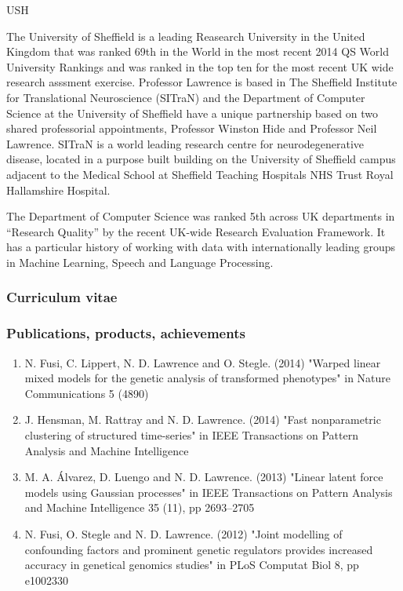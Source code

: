 \begin{sitedescription}{USH}


The University of Sheffield is a leading Reasearch University in the
United Kingdom that was ranked 69th in the World in the most recent
2014 QS World University Rankings and was ranked in the top ten for
the most recent UK wide research asssment exercise.  Professor
Lawrence is based in The Sheffield Institute for Translational
Neuroscience (SITraN) and the Department of Computer Science at the
University of Sheffield have a unique partnership based on two shared
professorial appointments, Professor Winston Hide and Professor Neil
Lawrence.  SITraN is a world leading research centre for
neurodegenerative disease, located in a purpose built building on the
University of Sheffield campus adjacent to the Medical School at
Sheffield Teaching Hospitals NHS Trust Royal Hallamshire Hospital. 

The Department of Computer Science was ranked 5th across UK
departments in ``Research Quality'' by the recent UK-wide Research
Evaluation Framework. It has a particular history of working with data
with internationally leading groups in Machine Learning, Speech and
Language Processing.

\subsubsection*{Curriculum vitae}




%

\subsubsection*{Publications, products, achievements}

\begin{enumerate}
\item N. Fusi, C. Lippert, N. D. Lawrence and O. Stegle. (2014) "Warped linear mixed models for the genetic analysis of transformed phenotypes" in Nature Communications 5 (4890)
\item J. Hensman, M. Rattray and N. D. Lawrence. (2014) "Fast nonparametric clustering of structured time-series" in IEEE Transactions on Pattern Analysis and Machine Intelligence
\item M. A. \'Alvarez, D. Luengo and N. D. Lawrence. (2013) "Linear latent force models using Gaussian processes" in IEEE Transactions on Pattern Analysis and Machine Intelligence 35 (11), pp 2693--2705
\item N. Fusi, O. Stegle and N. D. Lawrence. (2012) "Joint modelling of confounding factors and prominent genetic regulators provides increased accuracy in genetical genomics studies" in PLoS Computat Biol 8, pp e1002330
\end{enumerate}


\end{sitedescription}
